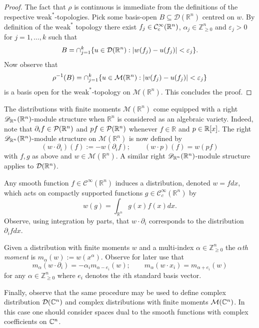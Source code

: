 \begin{proof}
   The fact that $\rho$ is continuous is immediate from the definitions of the respective $\text{weak}^*$-topologies.
   Pick some basis-open $B\subseteq \mathcal{D}(\mathbb{R}^n)$ centred on $w$.
   By definition of the $\text{weak}^*$ topology there exist $f_j\in \mathcal{C}_c^\infty(\mathbb{R}^n)$, $\alpha_j\in \mathbb{Z}^n_{\geq 0}$ and  $\varepsilon_j >0$ for $j=1,\ldots, k$ such that
   $$B = \cap_{j=1}^k \{u\in \mathcal{D}(\mathbb{R}^n): \vert w(f_j) -u(f_j) \vert <\varepsilon_j\}. $$
   Now observe that
   $$\rho^{-1}(B) = \cap_{j=1}^k \{u\in \mathcal{M}(\mathbb{R}^n): \vert w(f_j)-u(f_j) \vert <\varepsilon_j\}$$
   is a basis open for the $\text{weak}^*$-topology on $\mathcal{M}(\mathbb{R}^n)$.
   This concludes the proof.
\end{proof}

The distributions with finite moments $\mathcal{M}(\mathbb{R}^n)$ come equipped with a right $\mathscr{D}_{\mathbb{R}^n}(\mathbb{R}^n)$-module structure when $\mathbb{R}^n$ is considered as an algebraic variety.
Indeed, note that $\partial_i f\in \mathcal{P}(\mathbb{R}^n)$ and $pf\in \mathcal{P}(\mathbb{R}^n)$ whenever $f\in \mathbb{R}$ and $p\in \mathbb{R}[x]$.
The right $\mathscr{D}_{\mathbb{R}^n}(\mathbb{R}^n)$-module structure on $\mathcal{M}(\mathbb{R}^n)$ is now defined by
$$(w\cdot \partial_i)(f) := -w(\partial_i f); \qquad (w\cdot p)(f) = w(pf)$$
with $f,g$ as above and $w\in \mathcal{M}(\mathbb{R}^n)$.
A similar right $\mathscr{D}_{\mathbb{R}^n}(\mathbb{R}^n)$-module structure applies to $\mathcal{D}(\mathbb{R}^n)$.
\begin{remark}
  Any smooth function $f\in \mathcal{C}^\infty(\mathbb{R}^n)$ induces a distribution, denoted $w = fdx$, which acts on compactly supported functions $g\in \mathcal{C}_c^\infty(\mathbb{R}^n)$ by
  $$w(g) =\int_{\mathbb{R}^n} g(x)f(x) dx.$$
  Observe, using integration by parts, that $w\cdot \partial_i$ corresponds to the distribution $\partial_i f dx$.
\end{remark}

Given a distribution with finite moments $w$ and a multi-index $\alpha\in \mathbb{Z}_{\geq 0}^n$ the {\it $\alpha$th moment} is $m_{\alpha}(w):= w(x^\alpha)$.
Observe for later use that
$$ m_{\alpha}(w\cdot \partial_i) = -\alpha_i m_{\alpha -e_i}(w); \qquad m_{\alpha}(w\cdot x_i) = m_{\alpha + e_i}(w)$$
for any $\alpha \in \mathbb{Z}_{\geq 0}^{n}$ where $e_i$ denotes the $i$th standard basis vector.

Finally, observe that the same procedure may be used to define complex distribution $\mathcal{D}(\mathbb{C}^n)$ and complex distributions with finite moments $\mathcal{M}(\mathbb{C}^n)$.
In this case one should consider spaces dual to the smooth functions with complex coefficients on $\mathbb{C}^n$.

